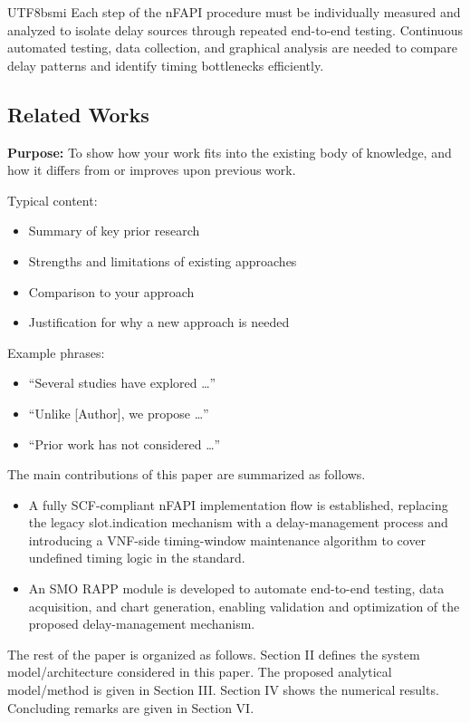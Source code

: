 \documentclass[conference]{IEEEtran}
\begin{document}
\begin{CJK}{UTF8}{bsmi}
{Each step of the nFAPI procedure must be individually measured and analyzed to isolate delay sources through repeated end-to-end testing. Continuous automated testing, data collection, and graphical analysis are needed to compare delay patterns and identify timing bottlenecks efficiently.
}

\subsection{Related Works}
{\bf Purpose:} To show how your work fits into the existing body of knowledge, and how it differs from or improves upon previous work.

Typical content:
\begin{itemize}
\item Summary of key prior research
\item Strengths and limitations of existing approaches
\item Comparison to your approach
\item Justification for why a new approach is needed
\end{itemize}

Example phrases:
\begin{itemize}
\item “Several studies have explored …”
\item “Unlike [Author], we propose …”
\item “Prior work has not considered …”
\end{itemize}



{\color{blue}
The main contributions of this paper are summarized as follows.
\begin{itemize}
\item A fully SCF-compliant nFAPI implementation flow is established, replacing the legacy slot.indication mechanism with a delay-management process and introducing a VNF-side timing-window maintenance algorithm to cover undefined timing logic in the standard.
\item An SMO RAPP module is developed to automate end-to-end testing, data acquisition, and chart generation, enabling validation and optimization of the proposed delay-management mechanism.
\end{itemize}

The rest of the paper is organized as follows. Section II defines the system model/architecture considered in this paper. The proposed analytical model/method is given in Section III. Section IV shows the numerical results. Concluding remarks are given in Section VI.
}



\end{CJK}
\end{document}
